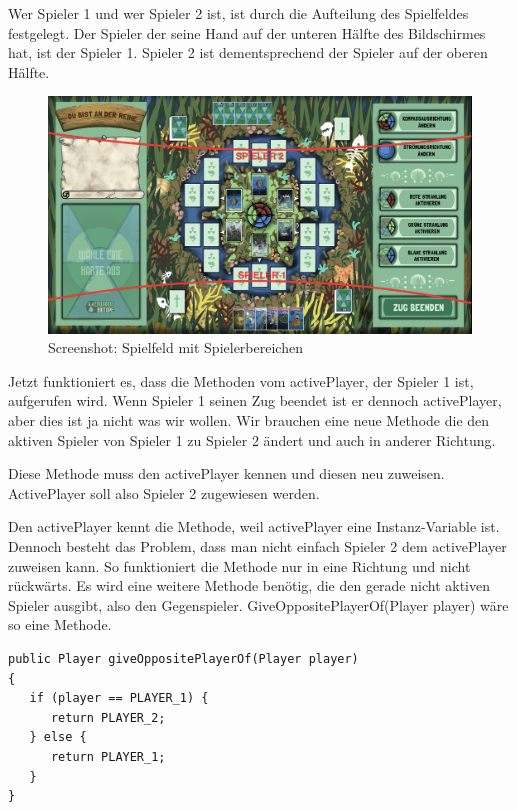 Wer Spieler 1 und wer Spieler 2 ist, ist durch die Aufteilung des Spielfeldes festgelegt. Der Spieler der seine Hand auf der unteren Hälfte des Bildschirmes hat, ist der Spieler 1. Spieler 2 ist dementsprechend der Spieler auf der oberen Hälfte.

\begin{figure}[h]
\includegraphics[width=1\textwidth]{../img/screenshot_spielfeldeinteilung.PNG}
\caption{Screenshot: Spielfeld mit Spielerbereichen}
\label{fig:Screenshot Spielfeld Spielerbereiche}
\end{figure}

Jetzt funktioniert es, dass die Methoden vom activePlayer, der Spieler 1 ist, aufgerufen wird. Wenn Spieler 1 seinen Zug beendet ist er dennoch activePlayer, aber dies ist ja nicht was wir wollen. Wir brauchen eine neue Methode die den aktiven Spieler von Spieler 1 zu Spieler 2 ändert und auch in anderer Richtung.

Diese Methode muss den activePlayer kennen und diesen neu zuweisen. ActivePlayer soll also Spieler 2 zugewiesen werden.

Den activePlayer kennt die Methode, weil activePlayer eine Instanz-Variable ist. Dennoch besteht das Problem, dass man nicht einfach Spieler 2 dem activePlayer zuweisen kann. So funktioniert die Methode nur in eine Richtung und nicht rückwärts. Es wird eine weitere Methode benötig, die den gerade nicht aktiven Spieler ausgibt, also den Gegenspieler. GiveOppositePlayerOf(Player player) wäre so eine Methode.

\begin{lstlisting}
public Player giveOppositePlayerOf(Player player)
{
   if (player == PLAYER_1) {
      return PLAYER_2;
   } else {
      return PLAYER_1;
   }
}
\end{lstlisting}

